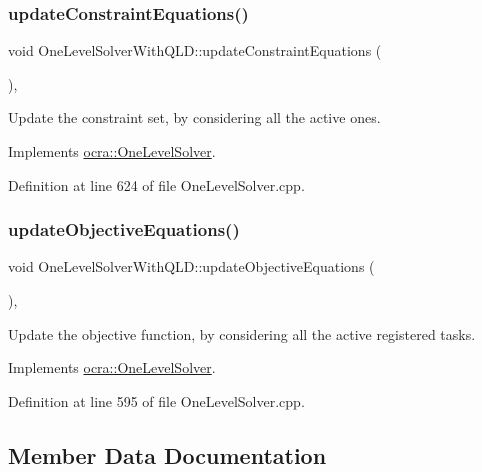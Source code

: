 \subsubsection{\texorpdfstring{update\+Constraint\+Equations()}{updateConstraintEquations()}}
{\footnotesize\ttfamily void One\+Level\+Solver\+With\+Q\+L\+D\+::update\+Constraint\+Equations (\begin{DoxyParamCaption}{ }\end{DoxyParamCaption})\hspace{0.3cm}{\ttfamily [protected]}, {\ttfamily [virtual]}}

Update the constraint set, by considering all the active ones. 

Implements \hyperlink{classocra_1_1OneLevelSolver_af592dc713af6cf22e67abcdfba09ca5e}{ocra\+::\+One\+Level\+Solver}.



Definition at line 624 of file One\+Level\+Solver.\+cpp.

\hypertarget{classocra_1_1OneLevelSolverWithQLD_a23556b4af1bdbead4ecb242991dbd175}{}\label{classocra_1_1OneLevelSolverWithQLD_a23556b4af1bdbead4ecb242991dbd175} 
\subsubsection{\texorpdfstring{update\+Objective\+Equations()}{updateObjectiveEquations()}}
{\footnotesize\ttfamily void One\+Level\+Solver\+With\+Q\+L\+D\+::update\+Objective\+Equations (\begin{DoxyParamCaption}{ }\end{DoxyParamCaption})\hspace{0.3cm}{\ttfamily [protected]}, {\ttfamily [virtual]}}

Update the objective function, by considering all the active registered tasks. 

Implements \hyperlink{classocra_1_1OneLevelSolver_a150b377a35e30ae9c347147c10fddb33}{ocra\+::\+One\+Level\+Solver}.



Definition at line 595 of file One\+Level\+Solver.\+cpp.



\subsection{Member Data Documentation}
\hypertarget{classocra_1_1OneLevelSolverWithQLD_aa7fbbc63b0e6654166aedee4c067af26}{}\label{classocra_1_1OneLevelSolverWithQLD_aa7fbbc63b0e6654166aedee4c067af26} 
